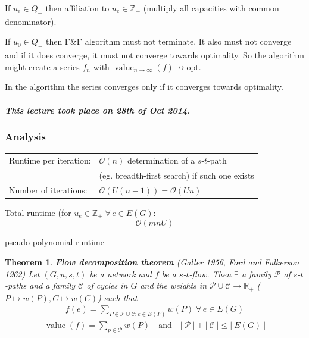 \documentclass{article}
\newtheorem{theorem}{Theorem}
\newcommand{\card}[1]{\left|\:\!#1\:\!\right|}
\newcommand{\dateref}[1]{\paragraph{\textit{This lecture took place on #1.}}}
\newcommand{\gath}[2]{$#1$-$#2$-path} %
\newcommand{\flow}[2]{$#1$-$#2$-flow}
\newcommand{\fall}{\;\forall\,}
\begin{document}
If $u_e \in Q_+$ then affiliation to $u_e \in \mathbb{Z}_+$ (multiply all capacities with common denominator).

If $u_0 \in Q_+$ then F\&F algorithm must not terminate. It also must not converge and if it does converge, it must not converge towards optimality. So the algorithm might create a series $f_n$ with $\operatorname{value}_{n\rightarrow\infty}(f) \nrightarrow \text{opt}$.

In the algorithm the series converges only if it converges towards optimality.

\dateref{28th of Oct 2014}

\subsubsection{Analysis}
%
\begin{center}
  \begin{tabular}{ll}
    Runtime per iteration:  & $\mathcal{O}(n)$ determination of a \gath st \\
                            & (eg. breadth-first search) if such one exists \\
    Number of iterations:   & $\mathcal{O}(U(n-1)) = \mathcal{O}(Un)$
  \end{tabular}
\end{center}

Total runtime (for $u_e \in \mathbb{Z}_+ \fall e \in E(G):$
\[
  \mathcal{O}(mnU)
\]
\begin{center}
  pseudo-polynomial runtime
\end{center}

\begin{theorem}\label{satz-4.5}
  \textbf{Flow decomposition theorem} (Galler 1956, Ford and Fulkerson 1962)
  Let $(G, u, s, t)$ be a network and $f$ be a \flow st. Then $\exists$ a family
  $\mathcal{P}$ of \gath sts and a family $\mathcal{C}$ of cycles in $G$ and the
  weights in $\mathcal{P} \cup \mathcal{C} \rightarrow \mathbb{R}_+$
  ($P \mapsto w(P), C \mapsto w(C)$) such that
  \begin{align*}
    f(e) = \sum_{P \in \mathcal{P} \cup \mathcal{C}: e \in E(P)} w(P) \fall e \in E(G)
  \end{align*}
  \begin{align*}
    \operatorname{value}(f) = \sum_{p \in \mathcal{P}} w(P)
      \quad\text{and}\quad
      \card{\mathcal{P}} + \card{\mathcal{C}} \leq \card{E(G)}
  \end{align*}
\end{theorem}
\end{document}
